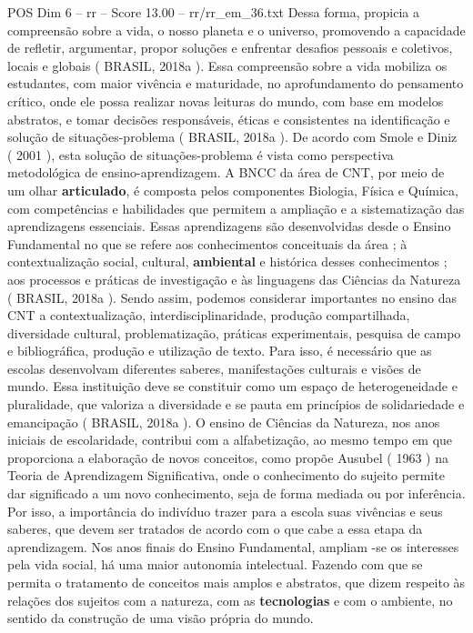 \begin{textsample}{POS Dim 6 – rr – Score 13.00 – rr/rr\_em\_36.txt}
Dessa forma, propicia a compreensão sobre a vida, o nosso planeta e o universo, promovendo a capacidade de refletir, argumentar, propor soluções e enfrentar desafios pessoais e coletivos, locais e globais ( BRASIL, 2018a ).
Essa compreensão sobre a vida mobiliza os estudantes, com maior vivência e maturidade, no aprofundamento do pensamento crítico, onde ele possa realizar novas leituras do mundo, com base em modelos abstratos, e tomar decisões responsáveis, éticas e consistentes na identificação e solução de situações-problema ( BRASIL, 2018a ).
De acordo com Smole e Diniz ( 2001 ), esta solução de situações-problema é vista como perspectiva metodológica de ensino-aprendizagem.
A BNCC da área de CNT, por meio de um olhar \textbf{articulado}, é composta pelos componentes Biologia, Física e Química, com competências e habilidades que permitem a ampliação e a sistematização das aprendizagens essenciais.
Essas aprendizagens são desenvolvidas desde o Ensino Fundamental no que se refere aos conhecimentos conceituais da área ; à contextualização social, cultural, \textbf{ambiental} e histórica desses conhecimentos ; aos processos e práticas de investigação e às linguagens das Ciências da Natureza ( BRASIL, 2018a ).
Sendo assim, podemos considerar importantes no ensino das CNT a contextualização, interdisciplinaridade, produção compartilhada, diversidade cultural, problematização, práticas experimentais, pesquisa de campo e bibliográfica, produção e utilização de texto.
Para isso, é necessário que as escolas desenvolvam diferentes saberes, manifestações culturais e visões de mundo.
Essa instituição deve se constituir como um espaço de heterogeneidade e pluralidade, que valoriza a diversidade e se pauta em princípios de solidariedade e emancipação ( BRASIL, 2018a ).
O ensino de Ciências da Natureza, nos anos iniciais de escolaridade, contribui com a alfabetização, ao mesmo tempo em que proporciona a elaboração de novos conceitos, como propõe Ausubel ( 1963 ) na Teoria de Aprendizagem Significativa, onde o conhecimento do sujeito permite dar significado a um novo conhecimento, seja de forma mediada ou por inferência.
Por isso, a importância do indivíduo trazer para a escola suas vivências e seus saberes, que devem ser tratados de acordo com o que cabe a essa etapa da aprendizagem.
Nos anos finais do Ensino Fundamental, ampliam -se os interesses pela vida social, há uma maior autonomia intelectual.
Fazendo com que se permita o tratamento de conceitos mais amplos e abstratos, que dizem respeito às relações dos sujeitos com a natureza, com as \textbf{tecnologias} e com o ambiente, no sentido da construção de uma visão própria do mundo.

\end{textsample}
